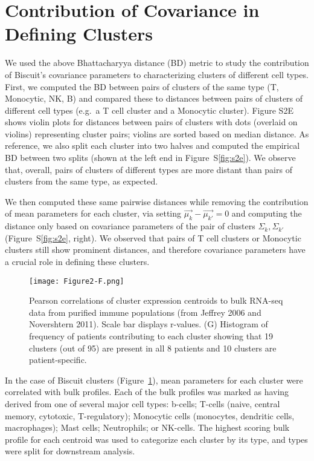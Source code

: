 \section{Contribution of Covariance in Defining Clusters}

We used the above Bhattacharyya distance (BD) metric to study the contribution of Biscuit's covariance parameters to characterizing clusters of different cell types.
First, we computed the BD between pairs of clusters of the same type (T, Monocytic, NK, B) and compared these to distances between pairs of clusters of different cell types (e.g.\ a T cell cluster and a Monocytic cluster).
Figure S2E shows violin plots for distances between pairs of clusters with dots (overlaid on violins) representing cluster pairs; violins are sorted based on median distance.
As reference, we also split each cluster into two halves and computed the empirical BD between two splits (shown at the left end in Figure~S\ref{fig:s2e}).
We observe that, overall, pairs of clusters of different types are more distant than pairs of clusters from the same type, as expected.

We then computed these same pairwise distances while removing the contribution of mean parameters for each cluster, via setting \(\overrightarrow{\mu_{k}} - \overrightarrow{\mu_{k'}} = 0\) and computing the distance only based on covariance parameters of the pair of clusters \(\Sigma_{k},\Sigma_{k'}\) (Figure~S\ref{fig:s2e}, right).
We observed that pairs of T cell clusters or Monocytic clusters still show prominent distances, and therefore covariance parameters have a crucial role in defining these clusters.


\begin{figure}
\centering
\texttt{[image: Figure2-F.png]}
\caption{Pearson correlations of cluster expression centroids to bulk RNA-seq data from purified immune populations (from Jeffrey 2006 and Novershtern 2011). Scale bar displays r-values.
(G) Histogram of frequency of patients contributing to each cluster showing that 19 clusters (out of 95) are present in all 8 patients and 10 clusters are patient-specific.
}
\label{fig:2f}
\end{figure}

In the case of Biscuit clusters (Figure~\ref{fig:2f}), mean parameters for each cluster were correlated with bulk profiles.
Each of the bulk profiles was marked as having derived from one of several major cell types: b-cells; T-cells (naive, central memory, cytotoxic, T-regulatory); Monocytic cells (monocytes, dendritic cells, macrophages); Mast cells; Neutrophils; or NK-cells.
The highest scoring bulk profile for each centroid was used to categorize each cluster by its type, and types were split for downstream analysis.

